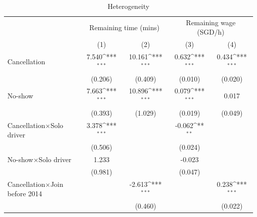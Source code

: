 \documentclass[reviewmode]{restat}
\begin{document}
\begin{table}[]


\clearpage

	\centering
	\caption{Heterogeneity}
	\label{tb:heterogeneity}	
		{
		\footnotesize
        \def\sym#1{\ifmmode^{#1}\else\(^{#1}\)\fi}
		\begin{tabularx}{\textwidth}{l@{\extracolsep{\fill}}*{4}{c}}
		\toprule
		\toprule
		                    &\multicolumn{2}{c}{Remaining time (mins)}  &\multicolumn{2}{c}{Remaining wage (SGD/h)} \\
		                    \cmidrule(lr){2-3}\cmidrule(lr){4-5}
		                    &\multicolumn{1}{c}{(1)}         &\multicolumn{1}{c}{(2)}         &\multicolumn{1}{c}{(3)}         &\multicolumn{1}{c}{(4)}         \\
		\midrule
		Cancellation     &       7.540\sym{***}&      10.161\sym{***}&       0.632\sym{***}&       0.434\sym{***}\\
		                    &     (0.206)         &     (0.409)         &     (0.010)         &     (0.020)         \\
		\addlinespace
		No-show           &       7.663\sym{***}&      10.896\sym{***}&       0.079\sym{***}&       0.017         \\
		                    &     (0.393)         &     (1.029)         &     (0.019)         &     (0.049)         \\
		\addlinespace
		Cancellation\(\times\)Solo driver&       3.378\sym{***}&                     &      -0.062\sym{**   } &                     \\
		                    &     (0.506)         &                     &     (0.024)         &                     \\
		\addlinespace
		No-show\(\times\)Solo driver&       1.233         &                     &      -0.023        &                     \\
		                    &     (0.981)         &                     &     (0.047)         &                     \\
		\addlinespace
		Cancellation\(\times\)Join before 2014&                     &      -2.613\sym{***}&                     &       0.238\sym{***}\\
		                    &                     &     (0.460)         &                     &     (0.022)         \\

\end{tabularx}}
\end{table}
\end{document}
